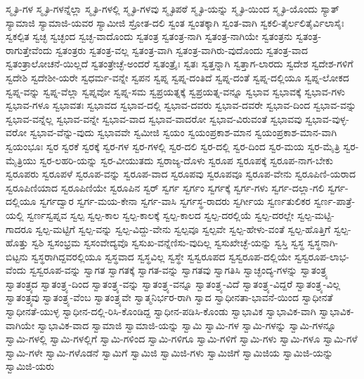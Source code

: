 {ಸ್ಮೃತಿ-ಗಳ
ಸ್ಮೃತಿ-ಗಳನ್ನೆಲ್ಲಾ
ಸ್ಮೃತಿ-ಗಳಲ್ಲಿ
ಸ್ಮೃತಿ-ಗಳವು
ಸ್ಮೃತಿಪಠೆ
ಸ್ಮೃತಿ-ಯನ್ನು
ಸ್ಮೃತಿ-ಯಿಂದ
ಸ್ಮೃತಿ-ಯೊಂದು
ಸ್ಯಾತ್
ಸ್ಯಾಮಾಜಿ
ಸ್ಯಾಮಾಜಿ-ಯವರ
ಸ್ಯಾಮೀಜಿ
ಸ್ರೋತ-ದಲಿ
ಸ್ವಂತ
ಸ್ವಂತಕ್ಕಾಗಿ
ಸ್ವಂತ-ವಾಗಿ
ಸ್ವಕಲಿ-ತೈರ್ಲಲಿತೈರ್ವಿಲಾಸೈಃ
ಸ್ವಕಲ್ಪಿತ
ಸ್ವಚ್ಛ
ಸ್ವಚ್ಛಂದ
ಸ್ವಚ್ಛ-ವಾದೊಂದು
ಸ್ವತಂತ್ರ
ಸ್ವತಂತ್ರ-ನಾಗಿ
ಸ್ವತಂತ್ರ-ನಾಗಿಯೇ
ಸ್ವತಂತ್ರನು
ಸ್ವತಂತ್ರ-ರಾಗುತ್ತೇವೆಂದು
ಸ್ವತಂತ್ರರು
ಸ್ವತಂತ್ರ-ವಲ್ಲ
ಸ್ವತಂತ್ರ-ವಾಗಿ
ಸ್ವತಂತ್ರ-ವಾಗಿರು-ವುದೊಂದು
ಸ್ವತಂತ್ರ-ವಾದ
ಸ್ವತಂತ್ರಾಲೋಚನೆ-ಯಿಲ್ಲದೆ
ಸ್ವತಂತ್ರೇಚ್ಛೆ-ಅಂದರೆ
ಸ್ವತಂತ್ರೈಃ
ಸ್ವತಃ
ಸ್ವತ್ತನ್ನಾಗಿ
ಸ್ವತ್ತಾಗ-ಲಾರದು
ಸ್ವದೇಶ
ಸ್ವದೇಶ-ಗಳಿಗೆ
ಸ್ವದೇಶಿ
ಸ್ವದೇಶೀ-ಯರೇ
ಸ್ವಧರ್ಮ-ವನ್ನೇ
ಸ್ವಪನ
ಸ್ವಪ್ನ
ಸ್ವಪ್ನ-ದಂತಿದೆ
ಸ್ವಪ್ನ-ದಂತೆ
ಸ್ವಪ್ನ-ದಲ್ಲಿಯೂ
ಸ್ವಪ್ನ-ಲೋಕದ
ಸ್ವಪ್ನ-ವನ್ನು
ಸ್ವಪ್ನ-ವೆಲ್ಲಾ
ಸ್ವಪ್ನವೋ
ಸ್ವಪ್ನ-ಸಮ
ಸ್ವಪ್ರಯತ್ನಕ್ಕೆ
ಸ್ವಪ್ರಯತ್ನ-ವನ್ನೂ
ಸ್ವಭಾವ
ಸ್ವಭಾವಕ್ಕೆ
ಸ್ವಭಾವ-ಗಳು
ಸ್ವಭಾವ-ಗಳೂ
ಸ್ವಭಾವತಃ
ಸ್ವಭಾವದ
ಸ್ವಭಾವ-ದಲ್ಲಿ
ಸ್ವಭಾವ-ದವರು
ಸ್ವಭಾವ-ದವರೇ
ಸ್ವಭಾವ-ದಿಂದ
ಸ್ವಭಾವ-ವನ್ನು
ಸ್ವಭಾವ-ವನ್ನೆಲ್ಲ
ಸ್ವಭಾವ-ವನ್ನೇ
ಸ್ವಭಾವ-ವಾದ
ಸ್ವಭಾವ-ವಾದರೋ
ಸ್ವಭಾವ-ವಿರುವಂತೆ
ಸ್ವಭಾವವು
ಸ್ವಭಾವ-ವುಳ್ಳ-ವರೋ
ಸ್ವಭಾವ-ವೆನ್ನು-ವುದು
ಸ್ವಭಾವವೇ
ಸ್ವಮೀಜಿ
ಸ್ವಯಂ
ಸ್ವಯಂಪ್ರಕಾಶ-ಮಾನ
ಸ್ವಯಂಪ್ರಕಾಶ-ಮಾನ-ವಾಗಿ
ಸ್ವಯಂಭೂಃ
ಸ್ವರ
ಸ್ವರಕೆ
ಸ್ವರಕ್ಕೆ
ಸ್ವರ-ಗಳ
ಸ್ವರ-ಗಳಲ್ಲಿ
ಸ್ವರ-ದಲಿ
ಸ್ವರ-ದಲ್ಲಿ
ಸ್ವರ-ದಿಂದ
ಸ್ವರ-ಮಯ
ಸ್ವರ-ಮೈತ್ರಿ
ಸ್ವರ-ಮೈತ್ರಿಯು
ಸ್ವರ-ಲಹರಿ-ಯನ್ನು
ಸ್ವರ-ವೀಯುತದು
ಸ್ವರಾಜ್ಯ-ದೊಳು
ಸ್ವರೂಪ
ಸ್ವರೂಪಕ್ಕೆ
ಸ್ವರೂಪ-ನಾಗ-ಬೇಕು
ಸ್ವರೂಪರು
ಸ್ವರೂಪಳೆ
ಸ್ವರೂಪ-ವನ್ನು
ಸ್ವರೂಪ-ವಾದ
ಸ್ವರೂಪವು
ಸ್ವರೂಪವೂ
ಸ್ವರೂಪ-ವೇನು
ಸ್ವರೂಪಿಣಿ-ಯರಾದ
ಸ್ವರೂಪಿಣಿಯಾದ
ಸ್ವರೂಪಿಣಿಯೇ
ಸ್ವರೂಪಿನ
ಸ್ವರ್
ಸ್ವರ್ಗ
ಸ್ವರ್ಗಂ
ಸ್ವರ್ಗಕ್ಕೆ
ಸ್ವರ್ಗ-ಗಳು
ಸ್ವರ್ಗ-ದಲ್ಲಾ-ಗಲಿ
ಸ್ವರ್ಗ-ದಲ್ಲಿಯೂ
ಸ್ವರ್ಗದ್ವಾರ
ಸ್ವರ್ಗ-ಮಯ-ಕೇನಾ
ಸ್ವರ್ಗ-ವಾಸಿ
ಸ್ವರ್ಗಸ್ಥ-ರಾದರು
ಸ್ವರ್ಗೀಯ
ಸ್ವರ್ಣತುಲಿಕರ
ಸ್ವರ್ಣ-ಪಾತ್ರೆ-ಯಲ್ಲಿ
ಸ್ವರ್ಣಸ್ವಪ್ನವ
ಸ್ವಲ್ಪ
ಸ್ವಲ್ಪ-ಕಾಲ
ಸ್ವಲ್ಪ-ಕಾಲಕ್ಕೆ
ಸ್ವಲ್ಪ-ಕಾಲದ
ಸ್ವಲ್ಪ-ದರಲ್ಲಿಯೆ
ಸ್ವಲ್ಪ-ದರಲ್ಲೇ
ಸ್ವಲ್ಪ-ಮಟ್ಟಿ-ಗಾದರೂ
ಸ್ವಲ್ಪ-ಮಟ್ಟಿಗೆ
ಸ್ವಲ್ಪ-ವನ್ನು
ಸ್ವಲ್ಪ-ವಿದ್ದು-ವೇನು
ಸ್ವಲ್ಪವೂ
ಸ್ವಲ್ಪವೇ
ಸ್ವಲ್ಪ-ಹೇಳು-ವಂತೆ
ಸ್ವಲ್ಪ-ಹೊತ್ತಿಗೆ
ಸ್ವಲ್ಪ-ಹೊತ್ತು
ಸ್ವಶಿ
ಸ್ವಸಂಭ್ರಮ
ಸ್ವಸಂವೇದ್ಯವೊ
ಸ್ವಸುಖ-ವನ್ನೆಣಿಸು-ವುದಿಲ್ಲ
ಸ್ವಸುಖೇಚ್ಛೆ-ಯನ್ನು
ಸ್ವಸ್ತಿ
ಸ್ವಸ್ಥ
ಸ್ವಸ್ಥನಾಗಿ-ಬಿಟ್ಟನು
ಸ್ವಸ್ಥರಾಗಿದ್ದವರಲ್ಲಿಯೂ
ಸ್ವಸ್ಥವಾದ
ಸ್ವಸ್ಥವಿಲ್ಲ
ಸ್ವಸ್ಥೇ
ಸ್ವಸ್ವರೂಪದ
ಸ್ವಸ್ವರೂಪ-ದಲ್ಲಿಯೇ
ಸ್ವಸ್ವರೂಪ-ಲಾಭ-ವೆಂದು
ಸ್ವಸ್ವರೂಪ-ವನ್ನು
ಸ್ವಾಗತ
ಸ್ವಾಗತಕ್ಕೆ
ಸ್ವಾಗತ-ವನ್ನು
ಸ್ವಾಗತವು
ಸ್ವಾಗತಿಸಿ
ಸ್ವಾಚ್ಛಂದ್ಯ-ಗಳನ್ನು
ಸ್ವಾತಂತ್ರ್ಯ
ಸ್ವಾತಂತ್ರ್ಯದ
ಸ್ವಾತಂತ್ರ್ಯ-ದಿಂದ
ಸ್ವಾತಂತ್ರ್ಯ-ವನ್ನು
ಸ್ವಾತಂತ್ರ್ಯ-ವನ್ನೂ
ಸ್ವಾತಂತ್ರ್ಯ-ವಿದೆ
ಸ್ವಾತಂತ್ರ್ಯ-ವಿದ್ದರೆ
ಸ್ವಾತಂತ್ರ್ಯ-ವಿಲ್ಲ
ಸ್ವಾತಂತ್ರ್ಯವು
ಸ್ವಾತಂತ್ರ್ಯ-ವೆಂಬ
ಸ್ವಾತಂತ್ರ್ಯವೇ
ಸ್ವಾತ್ಮನಿರ್ಭರ-ರಾಗಿ
ಸ್ವಾದ
ಸ್ವಾಧೀನತಾ-ಭಾವನೆ-ಯಿಂದ
ಸ್ವಾಧೀನತೆ
ಸ್ವಾಧೀನತೆ-ಯುಳ್ಳ
ಸ್ವಾಧೀನ-ದಲ್ಲಿ-ರಿಸಿ-ಕೊಂಡಿದ್ದ
ಸ್ವಾಧೀನ-ಪಡಿಸಿ-ಕೊಂಡು
ಸ್ವಾಭಾವಿಕ
ಸ್ವಾಭಾವಿಕ-ವಾಗಿ
ಸ್ವಾಭಾವಿಕ-ವಾಗಿಯೇ
ಸ್ವಾಭಾವಿಕ-ವಾದ
ಸ್ವಾಮಾಜಿ
ಸ್ವಾಮಾಜಿ-ಯನ್ನು
ಸ್ವಾಮಿ
ಸ್ವಾಮಿ-ಗಳ
ಸ್ವಾಮಿ-ಗಳನ್ನು
ಸ್ವಾಮಿ-ಗಳನ್ನೂ
ಸ್ವಾಮಿ-ಗಳಲ್ಲಿ
ಸ್ವಾಮಿ-ಗಳಲ್ಲಿಗೆ
ಸ್ವಾಮಿ-ಗಳಿಂದ
ಸ್ವಾಮಿ-ಗಳಿಗೂ
ಸ್ವಾಮಿ-ಗಳಿಗೆ
ಸ್ವಾಮಿ-ಗಳು
ಸ್ವಾಮಿ-ಗಳೂ
ಸ್ವಾಮಿ-ಗಳೆ
ಸ್ವಾಮಿ-ಗಳೇ
ಸ್ವಾಮಿ-ಗಳೊಡನೆ
ಸ್ವಾಮಿಗೆ
ಸ್ವಾಮಿಜಿ
ಸ್ವಾಮಿಜಿ-ಗಳು
ಸ್ವಾಮಿಜಿಗೆ
ಸ್ವಾಮಿಜಿಯ
ಸ್ವಾಮಿಜಿ-ಯನ್ನು
ಸ್ವಾಮಿಜಿ-ಯರು
}
